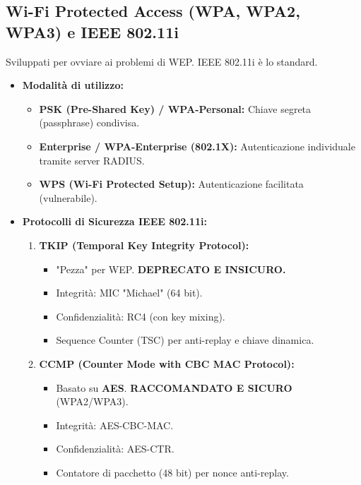 \subsection{Wi-Fi Protected Access (WPA, WPA2, WPA3) e IEEE 802.11i}
Sviluppati per ovviare ai problemi di WEP. IEEE 802.11i è lo standard.
\begin{itemize}
    \item \textbf{Modalità di utilizzo:}
    \begin{itemize}
        \item \textbf{PSK (Pre-Shared Key) / WPA-Personal:} Chiave segreta (passphrase) condivisa.
        \item \textbf{Enterprise / WPA-Enterprise (802.1X):} Autenticazione individuale tramite server RADIUS.
        \item \textbf{WPS (Wi-Fi Protected Setup):} Autenticazione facilitata (vulnerabile).
    \end{itemize}
    \item \textbf{Protocolli di Sicurezza IEEE 802.11i:}
    \begin{enumerate}
        \item \textbf{TKIP (Temporal Key Integrity Protocol):}
        \begin{itemize}
            \item "Pezza" per WEP. \textbf{DEPRECATO E INSICURO.}
            \item Integrità: MIC "Michael" (64 bit).
            \item Confidenzialità: RC4 (con key mixing).
            \item Sequence Counter (TSC) per anti-replay e chiave dinamica.
        \end{itemize}
        \item \textbf{CCMP (Counter Mode with CBC MAC Protocol):}
        \begin{itemize}
            \item Basato su \textbf{AES}. \textbf{RACCOMANDATO E SICURO} (WPA2/WPA3).
            \item Integrità: AES-CBC-MAC.
            \item Confidenzialità: AES-CTR.
            \item Contatore di pacchetto (48 bit) per nonce anti-replay.
        \end{itemize}
    \end{enumerate}
\end{itemize}

